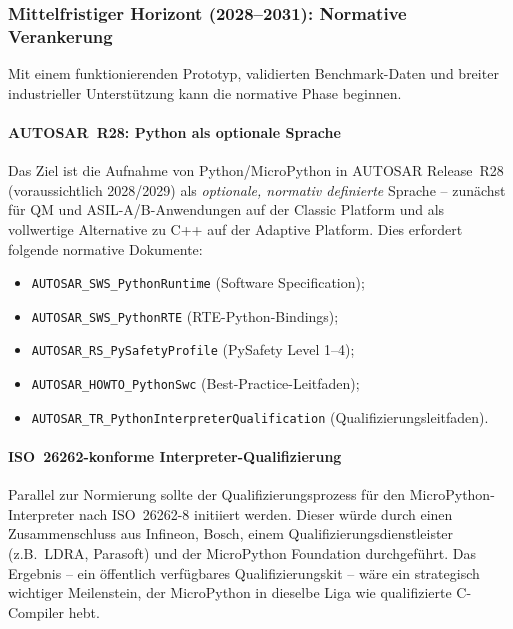 ﻿\documentclass[12pt,a4paper,twoside]{article}
\begin{document}
\subsubsection{Mittelfristiger Horizont (2028--2031): Normative Verankerung}

Mit einem funktionierenden Prototyp, validierten Benchmark-Daten und
breiter industrieller Unterstützung kann die normative Phase beginnen.

\paragraph{AUTOSAR~R28: Python als optionale Sprache}
Das Ziel ist die Aufnahme von Python/MicroPython in AUTOSAR Release~R28
(voraussichtlich 2028/2029) als \emph{optionale, normativ definierte}
Sprache -- zunächst für QM und ASIL-A/B-Anwendungen auf der Classic Platform
und als vollwertige Alternative zu C++ auf der Adaptive Platform.
Dies erfordert folgende normative Dokumente:
\begin{itemize}
  \item \texttt{AUTOSAR\_SWS\_PythonRuntime} (Software Specification);
  \item \texttt{AUTOSAR\_SWS\_PythonRTE} (RTE-Python-Bindings);
  \item \texttt{AUTOSAR\_RS\_PySafetyProfile} (PySafety Level 1--4);
  \item \texttt{AUTOSAR\_HOWTO\_PythonSwc} (Best-Practice-Leitfaden);
  \item \texttt{AUTOSAR\_TR\_PythonInterpreterQualification} (Qualifizierungsleitfaden).
\end{itemize}

\paragraph{ISO~26262-konforme Interpreter-Qualifizierung}
Parallel zur Normierung sollte der Qualifizierungsprozess für den
MicroPython-Interpreter nach ISO~26262-8 initiiert werden.
Dieser würde durch einen Zusammenschluss aus Infineon, Bosch, einem
Qualifizierungsdienstleister (z.B.\ LDRA, Parasoft) und der
MicroPython Foundation durchgeführt.
Das Ergebnis -- ein öffentlich verfügbares Qualifizierungskit --
wäre ein strategisch wichtiger Meilenstein, der MicroPython in
dieselbe Liga wie qualifizierte C-Compiler hebt.
\end{document}
